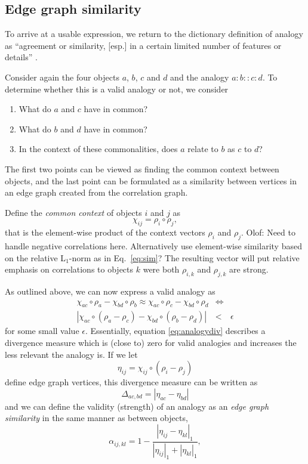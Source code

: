 \documentclass{article} %
\newcommand{\comment}[1]{{\small \color{red} {#1}} \normalcolor}
\newcommand{\rn}[1]{\rho_{#1}}
\newcommand{\ccn}[1]{\chi_{#1}}
\newcommand{\egr}[1]{\eta_{#1}}
\begin{document}
\subsection{Edge graph similarity}

To arrive at a usable expression, we return to the dictionary definition of analogy as ``agreement or similarity, [esp.] in a certain limited number of features or details'' \cite{makins1991collins}.

Consider again the four objects $a$, $b$, $c$ and $d$ and the analogy $a : b :: c : d$. To determine whether this is a valid 
analogy or not, we consider
\begin{enumerate}
	\item{What do $a$ and $c$ have in common?}
	\item{What do $b$ and $d$ have in common?}
	\item{In the context of these commonalities, does $a$ relate to $b$ as $c$ to $d$?}
\end{enumerate}
The first two points can be viewed as finding the common context between objects, and the last point can be formulated as a 
similarity between vertices in an edge graph created from the correlation graph.

Define the \emph{common context} of objects $i$ and $j$ as
\begin{equation}
\ccn{ij} = \rn{i} \circ \rn{j},
\end{equation}
that is the element-wise product of the context vectors $\rn{i}$ and $\rn{j}$. \comment{Olof: Need to handle negative correlations
here. Alternatively use element-wise similarity based on the relative L$_1$-norm as in Eq.\ \ref{eq:sim}?} The resulting vector will put relative 
emphasis on correlations to objects $k$ were both $\rn{i,k}$ and $\rn{j,k}$ are strong.

As outlined above, we can now express a valid analogy as
\begin{eqnarray}
\ccn{ac} \circ \rn{a} - \ccn{bd} \circ \rn{b} \approx \ccn{ac} \circ \rn{c} - \ccn{bd} \circ \rn{d}
& \Leftrightarrow &  \nonumber\\
\label{eq:analogydiv}
| \ccn{ac} \circ (\rn{a} - \rn{c}) - \ccn{bd} \circ (\rn{b} - \rn{d}) | & < & \epsilon
\end{eqnarray}
for some small value $\epsilon$. Essentially, equation \ref{eq:analogydiv} describes a divergence measure which is (close 
to) zero for valid analogies and increases the less relevant the analogy is. If we let
\begin{equation}
\label{eq:edgegraph}
\egr{ij} = \ccn{ij} \circ (\rn{i} - \rn{j})
\end{equation}
define edge graph vertices, this divergence measure can be written as
\begin{equation}
\Delta_{ac,bd} = | \egr{ac} - \egr{bd} |
\end{equation}
and we can define the validity (strength) of an analogy as an \emph{edge graph similarity} in the same manner as between 
objects,
\begin{equation}\label{eq:analogy}
\alpha_{ij,kl} = 1 - \frac{|{\egr{ij} - \egr{kl}}|_1}{|\egr{ij}|_1 + |\egr{kl}|_1},
\end{equation}
\end{document}
